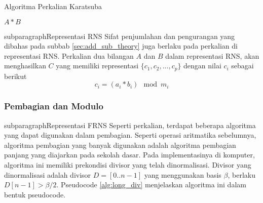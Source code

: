    \begin{algorithm}
      \caption{Algoritma Perkalian Karatsuba}
      \label{alg:karatsuba_mul}
      \begin{algorithmic}[1]
        \Statex
            \State \Return $A * B$
          \EndIf
          \State

          \State {}
        \EndFunction
      \end{algorithmic}
    \end{algorithm}


    subparagraph{Representasi RNS}
    Sifat penjumlahan dan pengurangan yang dibahas pada subbab \ref{sec:add_sub_theory} juga berlaku pada perkalian di representasi RNS. Perkalian dua bilangan $A$ dan $B$ dalam representasi RNS, akan menghasilkan $C$ yang memiliki representasi $\{c_1,c_2,...,c_p\}$ dengan nilai $c_i$ sebagai berikut
    \begin{equation}
        c_i = (a_i * b_i) \mod m_i
    \end{equation}

    \subsubsection{Pembagian dan Modulo}\label{sec:div_theory}

    subparagraph{Representasi FRNS}
    Seperti perkalian, terdapat beberapa algoritma yang dapat digunakan dalam pembagian. Seperti operasi aritmatika sebelumnya, algoritma pembagian yang banyak digunakan adalah algoritma pembagian panjang yang diajarkan pada sekolah dasar. Pada implementasinya di komputer, algoritma ini memiliki prekondisi divisor yang telah dinormalisasi. Divisor yang dinormalisasi adalah divisor $D = [0..n-1]$ yang menggunakan basis $\beta$, berlaku $D[n-1] > \beta/2$. Pseudocode \ref{alg:long_div} menjelaskan algoritma ini dalam bentuk pseudocode.

